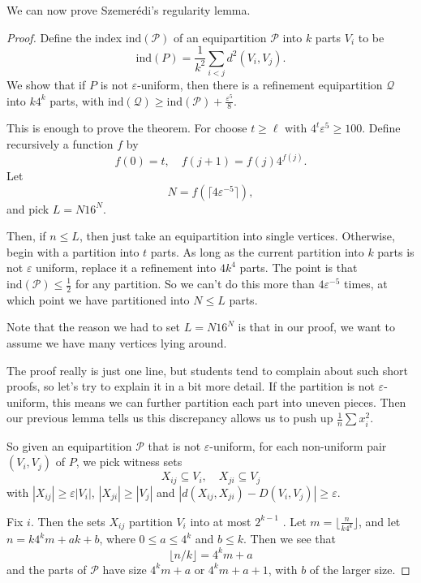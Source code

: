 \documentclass[a4paper]{article}
\newcommand\ind{\mathrm{ind}}
\begin{document}
We can now prove Szemer\'edi's regularity lemma.
\begin{proof}
  Define the index $\ind(\mathcal{P})$ of an equipartition $\mathcal{P}$ into $k$ parts $V_i$ to be
  \[
    \ind(P) = \frac{1}{k^2} \sum_{i < j} d^2(V_i, V_j).
  \]
  We show that if $P$ is not $\varepsilon$-uniform, then there is a refinement equipartition $\mathcal{Q}$ into $k 4^k$ parts, with $\ind(\mathcal{Q}) \geq \ind(\mathcal{P}) + \frac{\varepsilon^5}{8}$.

  This is enough to prove the theorem. For choose $t \geq \ell$ with $4^t \varepsilon^5 \geq 100$. Define recursively a function $f$ by
  \[
    f(0) = t,\quad f(j + 1) = f(j) 4^{f(j)}.
  \]
  Let
  \[
    N = f(\lceil 4 \varepsilon^{-5}\rceil),
  \]
  and pick $L = N 16^N$.

  Then, if $n \leq L$, then just take an equipartition into single vertices. Otherwise, begin with a partition into $t$ parts. As long as the current partition into $k$ parts is not $\varepsilon$ uniform, replace it a refinement into $4 k^4$ parts. The point is that $\ind(\mathcal{P}) \leq \frac{1}{2}$ for any partition. So we can't do this more than $4 \varepsilon^{-5}$ times, at which point we have partitioned into $N \leq L$ parts.

  Note that the reason we had to set $L = N 16^N$ is that in our proof, we want to assume we have many vertices lying around.

  The proof really is just one line, but students tend to complain about such short proofs, so let's try to explain it in a bit more detail. If the partition is not $\varepsilon$-uniform, this means we can further partition each part into uneven pieces. Then our previous lemma tells us this discrepancy allows us to push up $\frac{1}{n} \sum x_i^2$.

  So given an equipartition $\mathcal{P}$ that is not $\varepsilon$-uniform, for each non-uniform pair $(V_i, V_j)$ of $P$, we pick witness sets
  \[
    X_{ij} \subseteq V_i,\quad X_{ji} \subseteq V_j
  \]
  with $|X_{ij}| \geq \varepsilon |V_i|$, $|X_{ji}| \geq |V_j|$ and $|d(X_{ij}, X_{ji}) - D(V_i, V_j)| \geq \varepsilon$.

  Fix $i$. Then the sets $X_{ij}$ partition $V_i$ into at most $2^{k - 1}$ . Let $m = \lfloor\frac{n}{k4^k}\rfloor$, and let $n = k 4^k m + ak + b$, where $0 \leq a \leq 4^k$ and $b \leq k$. Then we see that
  \[
    \lfloor n/k\rfloor = 4^k m + a
  \]
  and the parts of $\mathcal{P}$ have size $4^k m + a$ or $4^km + a + 1$, with $b$ of the larger size.


\end{proof}
\end{document}
